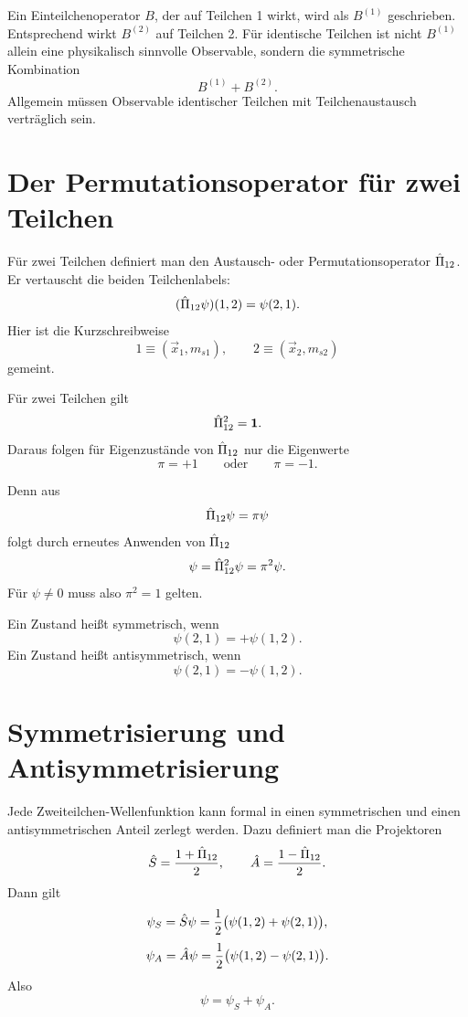 Ein Einteilchenoperator \(B\), der auf Teilchen 1 wirkt, wird als \(B^{(1)}\) geschrieben. Entsprechend wirkt \(B^{(2)}\) auf Teilchen 2. Für identische Teilchen ist nicht \(B^{(1)}\) allein eine physikalisch sinnvolle Observable, sondern die symmetrische Kombination
\[
    B^{(1)}+B^{(2)}.
\]
Allgemein müssen Observable identischer Teilchen mit Teilchenaustausch verträglich sein.

\section{Der Permutationsoperator für zwei Teilchen}

Für zwei Teilchen definiert man den Austausch- oder Permutationsoperator \(\hat\Pi_{12}\). Er vertauscht die beiden Teilchenlabels:
\[
    (\hat\Pi_{12}\psi)(1,2)=\psi(2,1).
\]
Hier ist die Kurzschreibweise
\[
    1\equiv (\vec x_1,m_{s1}),
    \qquad
    2\equiv (\vec x_2,m_{s2})
\]
gemeint.

\begin{formulabox}
Für zwei Teilchen gilt
\[
    \hat\Pi_{12}^2=\mathbf{1}.
\]
Daraus folgen für Eigenzustände von \(\hat\Pi_{12}\) nur die Eigenwerte
\[
    \pi=+1
    \qquad\text{oder}\qquad
    \pi=-1.
\]
\end{formulabox}

Denn aus
\[
    \hat\Pi_{12}\psi=\pi\psi
\]
folgt durch erneutes Anwenden von \(\hat\Pi_{12}\)
\[
    \psi=\hat\Pi_{12}^2\psi=\pi^2\psi.
\]
Für \(\psi\neq0\) muss also \(\pi^2=1\) gelten.

\begin{definitionbox}
Ein Zustand heißt symmetrisch, wenn
\[
    \psi(2,1)=+\psi(1,2).
\]
Ein Zustand heißt antisymmetrisch, wenn
\[
    \psi(2,1)=-\psi(1,2).
\]
\end{definitionbox}

\section{Symmetrisierung und Antisymmetrisierung}

Jede Zweiteilchen-Wellenfunktion kann formal in einen symmetrischen und einen antisymmetrischen Anteil zerlegt werden. Dazu definiert man die Projektoren
\[
    \hat S = \frac{1+\hat\Pi_{12}}{2},
    \qquad
    \hat A = \frac{1-\hat\Pi_{12}}{2}.
\]
Dann gilt
\[
    \psi_S = \hat S\psi
    = \frac{1}{2}\bigl(\psi(1,2)+\psi(2,1)\bigr),
\]
\[
    \psi_A = \hat A\psi
    = \frac{1}{2}\bigl(\psi(1,2)-\psi(2,1)\bigr).
\]
Also
\[
    \psi = \psi_S + \psi_A.
\]

